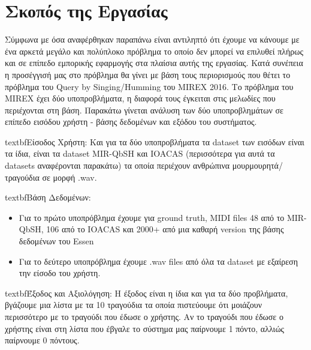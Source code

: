 \section{Σκοπός της Εργασίας}
Σύμφωνα με όσα αναφέρθηκαν παραπάνω είναι αντιληπτό ότι έχουμε να κάνουμε με
ένα αρκετά μεγάλο και πολύπλοκο πρόβλημα το οποίο δεν μπορεί να επιλυθεί πλήρως
και σε επίπεδο εμπορικής εφαρμογής στα πλαίσια αυτής της εργασίας. Κατά συνέπεια
η προσέγγισή μας στο πρόβλημα θα γίνει με βάση τους περιορισμούς που θέτει το
πρόβλημα του Query by Singing/Humming του MIREX 2016\cite{mirex}. Το πρόβλημα
του MIREX έχει δύο υποπροβλήματα, η διαφορά τους έγκειται στις μελωδίες που
περιέχονται στη βάση. Παρακάτω γίνεται ανάλυση των δύο υποπροβλημάτων σε
επίπεδο εισόδου χρήστη - βάσης δεδομένων και εξόδου του συστήματος.

textbf{Είσοδος Χρήστη:}
\newline
Και για τα δύο υποπροβλήματα τα dataset των εισόδων είναι τα ίδια, είναι τα
dataset MIR-QbSH και IOACAS (περισσότερα για αυτά τα datasets αναφέρονται
παρακάτω) τα οποία περιέχουν ανθρώπινα μουρμουρητά/τραγούδια σε μορφή .wav.

textbf{Βάση Δεδομένων:}
\newline
\begin{itemize}
  \item Για το πρώτο υποπρόβλημα έχουμε για ground truth, MIDI files 48 από το
  MIR-QbSH, 106 από το IOACAS και 2000+ από μια καθαρή version της βάσης
  δεδομένων του Essen \cite{esac-dataset}
  \item Για το δεύτερο υποπρόβλημα έχουμε .wav files από όλα τα dataset με
  εξαίρεση την είσοδο του χρήστη.
\end{itemize}

textbf{Έξοδος και Αξιολόγηση:}
\newline
Η έξοδος είναι η ίδια και για τα δύο προβλήματα, βγάζουμε μια λίστα με τα 10
τραγούδια τα οποία πιστεύουμε ότι μοιάζουν περισσότερο με το τραγούδι που έδωσε
ο χρήστης. Αν το τραγούδι που έδωσε ο χρήστης είναι στη λίστα που έβγαλε το
σύστημα μας παίρνουμε 1 πόντο, αλλιώς παίρνουμε 0 πόντους.
